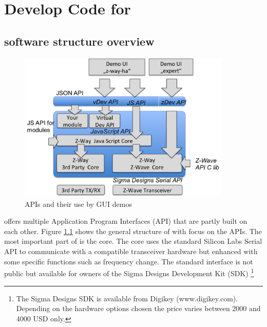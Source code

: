 \chapter{Develop Code for \zway}
\label{c:developer}

\section{\zway software structure overview}

\begin{figure}
\includegraphics[width=0.9\textwidth]{pngs/cap11/apis.png}
\caption{\zway APIs and their use by GUI demos}
\label{apis}
\end{figure}

\zway offers multiple Application Program Interfaces (API) that are partly built on each 
other. Figure \ref{apis} shows the general structure of \zway with focus on the APIs. The 
most important part of \zway is the \zwave core. The \zwave core uses the standard Silicon
Labs Serial API to communicate with a \zwave compatible transceiver hardware but enhanced 
with some \zway specific functions such as frequency change. The standard interface is 
not public but available for owners of the Sigma Designs Development Kit (SDK)
\footnote{The Sigma Designs SDK is available from Digikey (www.digikey.com). Depending 
on the hardware options chosen the price varies between 2000 and 4000 USD only.}

